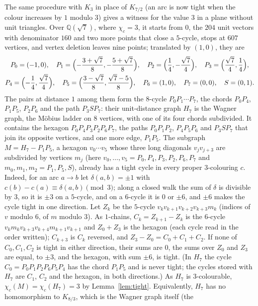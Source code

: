\documentclass[11pt,a4paper]{amsart}
\theoremstyle{remark}
\newcommand{\Q}{\mathbb{Q}}
\begin{document}
The same procedure with $K_3$ in place of $K_{7/2}$ (an arc is now tight when the colour increases by $1$ modulo
$3$) gives a witness for the value $3$ in a plane without unit triangles. Over $\Q(\sqrt7)$, where $\chi_c=3$, it
starts from $0$, the $204$ unit vectors with denominator $160$ and two more points that close a $5$-cycle, stops at
$607$ vertices, and vertex deletion leaves nine points; translated by $(1,0)$, they are
\begin{gather*}
P_0=(-1,0),\quad P_1=\Bigl(-\frac{3+\sqrt7}8,-\frac{5+\sqrt7}8\Bigr),\quad P_2=\Bigl(\frac14,-\frac{\sqrt7}4\Bigr),
\quad P_3=\Bigl(\frac{\sqrt7}4,\frac14\Bigr),\\
P_4=\Bigl(-\frac14,\frac{\sqrt7}4\Bigr),\quad P_5=\Bigl(\frac{3-\sqrt7}8,\frac{\sqrt7-5}8\Bigr),\quad P_6=(1,0),
\quad P_7=(0,0),\quad S=(0,1).
\end{gather*}
The pairs at distance $1$ among them form the $8$-cycle $P_0P_1\cdots P_7$, the chords $P_0P_4$, $P_1P_5$, $P_2P_6$
and the path $P_3SP_7$: their unit-distance graph $H_7$ is the Wagner graph, the M\"obius ladder on $8$ vertices,
with one of its four chords subdivided. It contains the hexagon $P_0P_4P_3P_2P_6P_7$, the paths $P_0P_1P_2$,
$P_4P_5P_6$ and $P_3SP_7$ that join its opposite vertices, and one more edge, $P_1P_5$. The subgraph
$M=H_7-P_1P_5$, a hexagon $v_0\cdots v_5$ whose three long diagonals $v_jv_{j+3}$ are subdivided by vertices $m_j$
(here $v_0,\dots,v_5=P_0,P_4,P_3,P_2,P_6,P_7$ and $m_0,m_1,m_2=P_1,P_5,S$), already has a tight cycle in every proper
$3$-colouring $c$. Indeed, for an arc $a\to b$ let $\delta(a,b)=\pm1$ with $c(b)-c(a)\equiv\delta(a,b)\pmod3$;
along a closed walk the sum of $\delta$ is divisible by $3$, so it is $\pm3$ on a $5$-cycle, and on a $6$-cycle it is
$0$ or $\pm6$, and $\pm6$ makes the cycle tight in one direction. Let $Z_k$ be the $5$-cycle
$v_kv_{k+1}v_{k+2}v_{k+3}m_k$ (indices of $v$ modulo $6$, of $m$ modulo $3$). As $1$-chains, $C_k=Z_{k+1}-Z_k$ is the
$6$-cycle $v_km_kv_{k+3}v_{k+4}m_{k+1}v_{k+1}$ and $Z_0+Z_3$ is the hexagon (each cycle read in the order written);
$C_{k+3}$ is $C_k$ reversed, and $Z_3-Z_0=C_0+C_1+C_2$. If none of $C_0,C_1,C_2$ is tight in either direction, their
sums are $0$, the sums over $Z_0$ and $Z_3$ are equal, to $\pm3$, and the hexagon, with sum $\pm6$, is tight. (In
$H_7$ the cycle $C_0=P_0P_1P_2P_6P_5P_4$ has the chord $P_1P_5$ and is never tight; the cycles stored with $H_7$ are
$C_1$, $C_2$ and the hexagon, in both directions.) As $H_7$ is $3$-colourable, $\chi_c(M)=\chi_c(H_7)=3$ by
Lemma~\ref{lem:tight}. Equivalently, $H_7$ has no homomorphism to $K_{8/3}$, which is the Wagner graph itself (the
\end{document}
